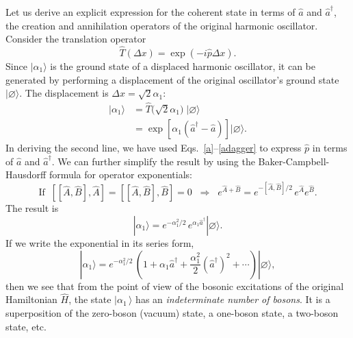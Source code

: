 \documentclass[prx,12pt]{revtex4-2}
\begin{document}
Let us derive an explicit expression for the coherent state in terms
of $\hat{a}$ and $\hat{a}^\dagger$, the creation and annihilation
operators of the original harmonic oscillator.  Consider the
translation operator
\begin{equation}
  \hat{T}(\Delta x) = \exp(-i\hat{p}\Delta x).
\end{equation}
Since $|\alpha_1\rangle$ is the ground state of a displaced harmonic
oscillator, it can be generated by performing a displacement of the
original oscillator's ground state $|\varnothing\rangle$.  The
displacement is $\Delta x = \sqrt{2}\alpha_1$:
\begin{align}
  |\alpha_1\rangle &= \hat{T}\big(\sqrt{2}\alpha_1\big)\; |\varnothing\rangle  \\
  &= \exp\left[\alpha_1\left(\hat{a}^\dagger - \hat{a}\right)\right] |\varnothing\rangle.
\end{align}
In deriving the second line, we have used
Eqs.~\eqref{a}--\eqref{adagger} to express $\hat{p}$ in terms of
$\hat{a}$ and $\hat{a}^\dagger$.  We can further simplify the result
by using the Baker-Campbell-Hausdorff formula for operator
exponentials:
\begin{equation}
  \mathrm{If} \;\; [[\hat{A},\hat{B}],\hat{A}] = [[\hat{A},\hat{B}],\hat{B}] = 0
  \;\;\Rightarrow \;\; e^{\hat{A}+\hat{B}}
  = e^{-[\hat{A},\hat{B}]/2}\, e^{\hat{A}} e^{\hat{B}}.
\end{equation}
The result is
\begin{equation}
  |\alpha_1\rangle = e^{-\alpha_1^2/2} \, e^{\alpha_1 \hat{a}^\dagger} |\varnothing\rangle.
\end{equation}
If we write the exponential in its series form,
\begin{equation}
  |\alpha_1\rangle = e^{-\alpha_1^2/2} \, \left(1 + \alpha_1 \hat{a}^\dagger
  + \frac{\alpha_1^2}{2} \left(\hat{a}^\dagger\right)^2 + \cdots\right)
 |\varnothing\rangle,
\end{equation}
then we see that from the point of view of the bosonic excitations of
the original Hamiltonian $\hat{H}$, the state $|\alpha_1\,\rangle$ has
an \textit{indeterminate number of bosons}.  It is a superposition of
the zero-boson (vacuum) state, a one-boson state, a two-boson state,
etc.
\end{document}
